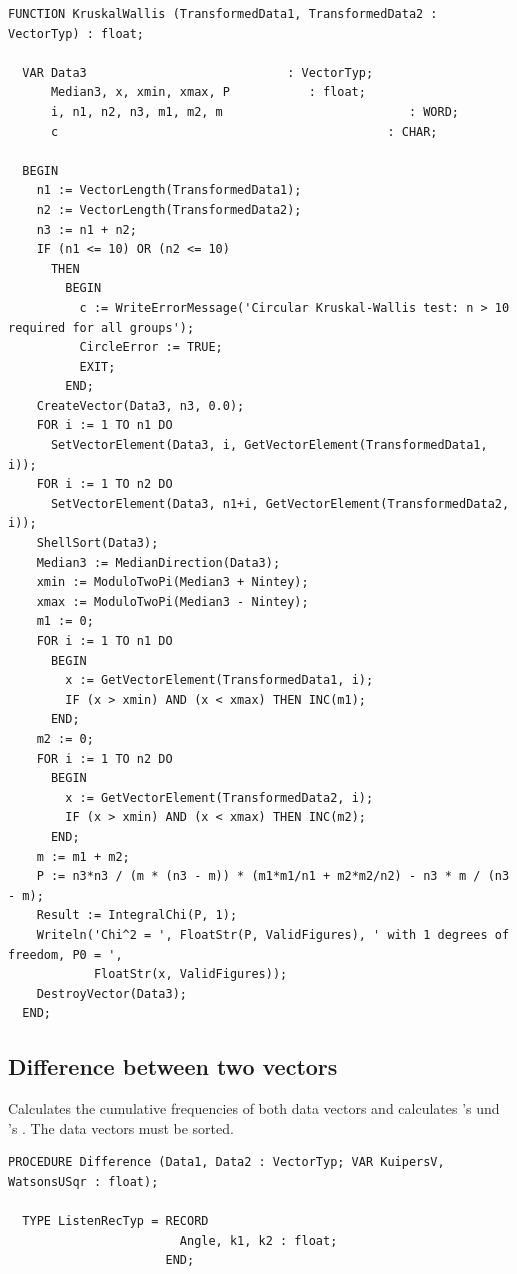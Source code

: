 \begin{refsection}
\begin{lstlisting}[caption=Kruskal-Wallis test]
  FUNCTION KruskalWallis (TransformedData1, TransformedData2 : VectorTyp) : float;

  VAR Data3                            : VectorTyp;
      Median3, x, xmin, xmax, P           : float;
      i, n1, n2, n3, m1, m2, m                          : WORD;
      c                                              : CHAR;

  BEGIN
    n1 := VectorLength(TransformedData1);
    n2 := VectorLength(TransformedData2);
    n3 := n1 + n2;
    IF (n1 <= 10) OR (n2 <= 10)
      THEN
        BEGIN
          c := WriteErrorMessage('Circular Kruskal-Wallis test: n > 10 required for all groups');
          CircleError := TRUE;
          EXIT;
        END;
    CreateVector(Data3, n3, 0.0);
    FOR i := 1 TO n1 DO
      SetVectorElement(Data3, i, GetVectorElement(TransformedData1, i));
    FOR i := 1 TO n2 DO
      SetVectorElement(Data3, n1+i, GetVectorElement(TransformedData2, i));
    ShellSort(Data3);
    Median3 := MedianDirection(Data3);
    xmin := ModuloTwoPi(Median3 + Nintey);
    xmax := ModuloTwoPi(Median3 - Nintey);
    m1 := 0;
    FOR i := 1 TO n1 DO
      BEGIN
        x := GetVectorElement(TransformedData1, i);
        IF (x > xmin) AND (x < xmax) THEN INC(m1);
      END;
    m2 := 0;
    FOR i := 1 TO n2 DO
      BEGIN
        x := GetVectorElement(TransformedData2, i);
        IF (x > xmin) AND (x < xmax) THEN INC(m2);
      END;
    m := m1 + m2;
    P := n3*n3 / (m * (n3 - m)) * (m1*m1/n1 + m2*m2/n2) - n3 * m / (n3 - m);
    Result := IntegralChi(P, 1);
    Writeln('Chi^2 = ', FloatStr(P, ValidFigures), ' with 1 degrees of freedom, P0 = ',
            FloatStr(x, ValidFigures));
    DestroyVector(Data3);
  END;
\end{lstlisting}

\subsection{Difference between two vectors}

Calculates the cumulative frequencies of both data vectors and calculates 's  und 's . The data vectors must be sorted.

\begin{lstlisting}[caption=Difference between two vectors]
  PROCEDURE Difference (Data1, Data2 : VectorTyp; VAR KuipersV, WatsonsUSqr : float);

  TYPE ListenRecTyp = RECORD
                        Angle, k1, k2 : float;
                      END;


\end{lstlisting}
\end{refsection}
